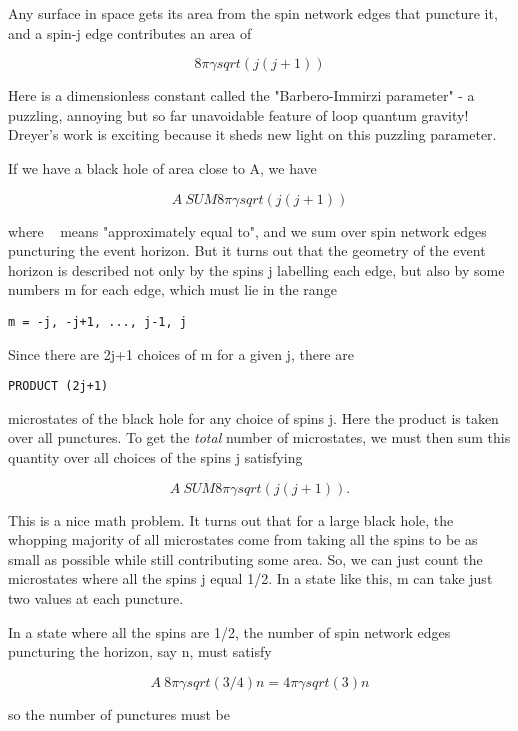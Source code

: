 Any surface in space gets its area from the spin network edges that
puncture it, and a spin-j edge contributes an area of

$$
8 \pi  \gamma  sqrt(j(j+1))
$$
    
Here \gamma  is a dimensionless constant called the "Barbero-Immirzi
parameter" - a puzzling, annoying but so far unavoidable feature of 
loop quantum gravity!  Dreyer's work is exciting because it sheds new
light on this puzzling parameter.

If we have a black hole of area close to A, we have

$$
A ~ SUM 8 \pi  \gamma  sqrt(j(j+1))
$$
    
where ~ means "approximately equal to", and we sum over spin network
edges puncturing the event horizon.  But it turns out that the geometry
of the event horizon is described not only by the spins j labelling each
edge, but also by some numbers m for each edge, which must lie in the
range

\begin{verbatim}
m = -j, -j+1, ..., j-1, j
\end{verbatim}
    
Since there are 2j+1 choices of m for a given j, there are 

\begin{verbatim}
PRODUCT (2j+1)
\end{verbatim}
    
microstates of the black hole for any choice of spins j.  Here the
product is taken over all punctures.  To get the \emph{total} number of
microstates, we must then sum this quantity over all choices of 
the spins j satisfying 

$$
A ~ SUM 8 \pi  \gamma  sqrt(j(j+1)).
$$
    
This is a nice math problem.  It turns out that for a large black hole,
the whopping majority of all microstates come from taking all the spins
to be as small as possible while still contributing some area.  So, we
can just count the microstates where all the spins j equal 1/2.  In a
state like this, m can take just two values at each puncture.

In a state where all the spins are 1/2, the number of spin network edges
puncturing the horizon, say n, must satisfy

$$
A ~ 8 \pi  \gamma  sqrt(3/4) n 

  = 4 \pi  \gamma  sqrt(3) n
$$
    
so the number of punctures must be


